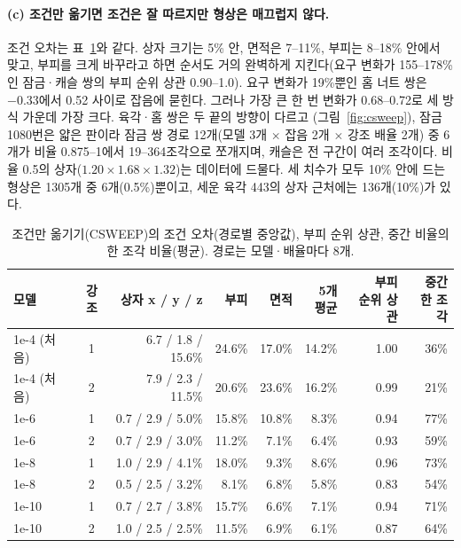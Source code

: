 \documentclass[11pt]{article}
\begin{document}
\paragraph{(c) 조건만 옮기면 조건은 잘 따르지만 형상은 매끄럽지 않다.}
조건 오차는 표~\ref{tab:csweep}와 같다. 상자 크기는 5\% 안, 면적은 7--11\%, 부피는 8--18\% 안에서 맞고, 부피를 크게 바꾸라고
하면 순서도 거의 완벽하게 지킨다(요구 변화가 155--178\%인 잠금·캐슬 쌍의 부피 순위 상관 0.90--1.0). 요구 변화가 19\%뿐인 홈 너트 쌍은
$-0.33$에서 0.52 사이로 잡음에 묻힌다. 그러나 가장 큰 한 번 변화가 0.68--0.72로 세 방식 가운데 가장 크다. 육각·홈 쌍은 두 끝의 방향이 다르고
(그림~\ref{fig:csweep}), 잠금 1080번은 얇은 판이라 잠금 쌍 경로 12개(모델 3개 $\times$ 잡음 2개 $\times$ 강조 배율 2개) 중 6개가 비율 0.875--1에서 19--364조각으로 쪼개지며, 캐슬은 전 구간이 여러 조각이다.
비율 0.5의 상자($1.20\times1.68\times1.32$)는 데이터에 드물다. 세 치수가 모두 10\% 안에 드는 형상은 1305개 중 6개(0.5\%)뿐이고,
세운 육각 443의 상자 근처에는 136개(10\%)가 있다.

\begin{table}[htbp]
\centering\small
\begin{tabular}{l c r r r r r r}
\toprule
모델 & 강조 & 상자 x / y / z & 부피 & 면적 & \shortstack[r]{5개\\평균} & \shortstack[r]{부피\\순위 상관} & \shortstack[r]{중간\\한 조각} \\
\midrule
1e-4 (처음) & 1 & 6.7 / 1.8 / 15.6\% & 24.6\% & 17.0\% & 14.2\% & 1.00 & 36\% \\
1e-4 (처음) & 2 & 7.9 / 2.3 / 11.5\% & 20.6\% & 23.6\% & 16.2\% & 0.99 & 21\% \\
1e-6 & 1 & 0.7 / 2.9 / 5.0\% & 15.8\% & 10.8\% & 8.3\% & 0.94 & 77\% \\
1e-6 & 2 & 0.7 / 2.9 / 3.0\% & 11.2\% & 7.1\% & 6.4\% & 0.93 & 59\% \\
1e-8 & 1 & 1.0 / 2.9 / 4.1\% & 18.0\% & 9.3\% & 8.6\% & 0.96 & 73\% \\
1e-8 & 2 & 0.5 / 2.5 / 3.2\% & 8.1\% & 6.8\% & 5.8\% & 0.83 & 54\% \\
1e-10 & 1 & 0.7 / 2.7 / 3.8\% & 15.7\% & 6.6\% & 7.1\% & 0.94 & 71\% \\
1e-10 & 2 & 1.0 / 2.5 / 2.5\% & 11.5\% & 6.9\% & 6.1\% & 0.87 & 64\% \\
\bottomrule
\end{tabular}
\caption{조건만 옮기기(CSWEEP)의 조건 오차(경로별 중앙값), 부피 순위 상관, 중간 비율의 한 조각 비율(평균). 경로는 모델·배율마다 8개.}
\label{tab:csweep}
\end{table}
\end{document}
